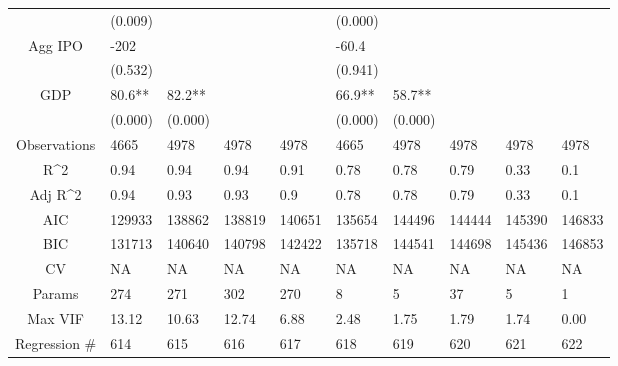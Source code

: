 \documentclass{article}
\begin{document}
\begin{table}[H]
\begin{tabular}{|clllllllll|}
   & (0.009) &  &  &  & (0.000) &  &  &  &  \\ 
  Agg IPO & -202 &  &  &  & -60.4 &  &  &  &  \\ 
   & (0.532) &  &  &  & (0.941) &  &  &  &  \\ 
  GDP & 80.6** & 82.2** &  &  & 66.9** & 58.7** &  &  &  \\ 
   & (0.000) & (0.000) &  &  & (0.000) & (0.000) &  &  &  \\ 
  \hline 
 Observations & 4665 & 4978 & 4978 & 4978 & 4665 & 4978 & 4978 & 4978 & 4978 \\ 
  R^2 & 0.94 & 0.94 & 0.94 & 0.91 & 0.78 & 0.78 & 0.79 & 0.33 & 0.1 \\ 
  Adj R^2 & 0.94 & 0.93 & 0.93 & 0.9 & 0.78 & 0.78 & 0.79 & 0.33 & 0.1 \\ 
  AIC & 129933 & 138862 & 138819 & 140651 & 135654 & 144496 & 144444 & 145390 & 146833 \\ 
  BIC & 131713 & 140640 & 140798 & 142422 & 135718 & 144541 & 144698 & 145436 & 146853 \\ 
  CV & NA & NA & NA & NA & NA & NA & NA & NA & NA \\ 
  Params & 274 & 271 & 302 & 270 & 8 & 5 & 37 & 5 & 1 \\ 
  Max VIF & 13.12 & 10.63 & 12.74 & 6.88 & 2.48 & 1.75 & 1.79 & 1.74 & 0.00 \\ 
  Regression \# & 614 & 615 & 616 & 617 & 618 & 619 & 620 & 621 & 622 \\ 
   \hline
\end{tabular}
 
\end{table}
\end{document}

